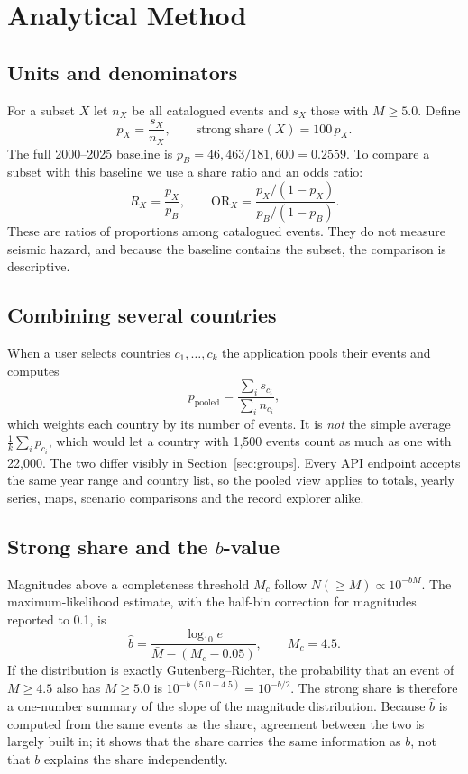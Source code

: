 \documentclass[11pt,a4paper]{article}
\begin{document}
\section{Analytical Method}
\subsection{Units and denominators}
For a subset $X$ let $n_X$ be all catalogued events and $s_X$ those with $M\ge5.0$. Define
\begin{equation}
p_X=\frac{s_X}{n_X},\qquad \text{strong share}(X)=100\,p_X .
\end{equation}
The full 2000--2025 baseline is $p_B = 46{,}463/181{,}600 = 0.2559$. To compare a subset with this baseline we use a share ratio and an odds ratio:
\begin{equation}
R_X=\frac{p_X}{p_B},\qquad \mathrm{OR}_X=\frac{p_X/(1-p_X)}{p_B/(1-p_B)} .
\end{equation}
These are ratios of proportions among catalogued events. They do not measure seismic hazard, and because the baseline contains the subset, the comparison is descriptive.

\subsection{Combining several countries}
When a user selects countries $c_1,\dots,c_k$ the application pools their events and computes
\begin{equation}
p_{\text{pooled}}=\frac{\sum_i s_{c_i}}{\sum_i n_{c_i}},
\end{equation}
which weights each country by its number of events. It is \emph{not} the simple average $\tfrac1k\sum_i p_{c_i}$, which would let a country with 1,500 events count as much as one with 22,000. The two differ visibly in Section~\ref{sec:groups}. Every API endpoint accepts the same year range and country list, so the pooled view applies to totals, yearly series, maps, scenario comparisons and the record explorer alike.

\subsection{Strong share and the $b$-value}
Magnitudes above a completeness threshold $M_c$ follow $N(\ge M)\propto10^{-bM}$.\cite{gr56} The maximum-likelihood estimate\cite{aki65}, with the half-bin correction for magnitudes reported to 0.1, is
\begin{equation}
\hat b=\frac{\log_{10}e}{\bar M-(M_c-0.05)} ,\qquad M_c=4.5 .
\end{equation}
If the distribution is exactly Gutenberg--Richter, the probability that an event of $M\ge4.5$ also has $M\ge5.0$ is $10^{-b\,(5.0-4.5)}=10^{-b/2}$. The strong share is therefore a one-number summary of the slope of the magnitude distribution. Because $\hat b$ is computed from the same events as the share, agreement between the two is largely built in; it shows that the share carries the same information as $b$, not that $b$ explains the share independently.
\end{document}
